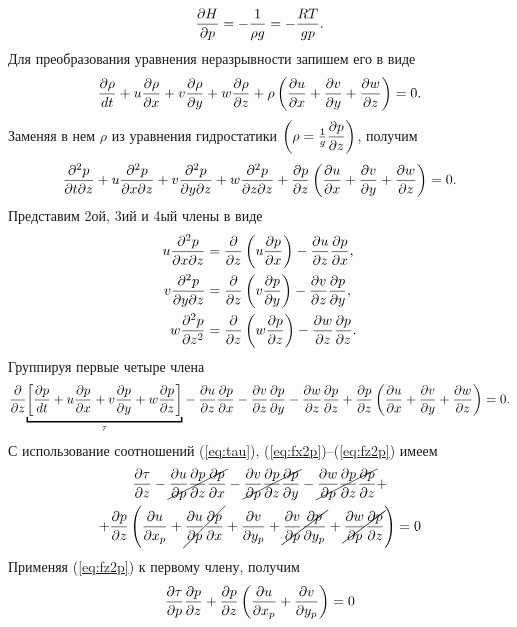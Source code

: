     \begin{equation}
        \label{ch6:DwDt2p}
        \pd{H}{p}=-\frac{1}{\rho g}=-\frac{RT}{gp}.
    \end{equation}
    Для преобразования уравнения неразрывности запишем его в виде
    \begin{equation*}
        \fd{\rho} + \rho \left( \pd{u}{x} + \pd{v}{y} + \pd{w}{z} \right) = 0.
    \end{equation*}
    Заменяя в нем $\rho$ из уравнения гидростатики $\left( \rho=\frac{1}{g} \pd{p}{z} \right)$, получим
    \begin{equation*}
        \frac{\partial^2 p}{\partial t \partial z} +
        u\frac{\partial^2 p}{\partial x \partial z} +
        v\frac{\partial^2 p}{\partial y \partial z} +
        w\frac{\partial^2 p}{\partial z \partial z} +
        \pd{p}{z} \left( \pd{u}{x} + \pd{v}{y} + \pd{w}{z} \right) = 0.
    \end{equation*}
    Представим 2ой, 3ий и 4ый члены в виде
    \begin{align*}
        u\frac{\partial^2 p}{\partial x \partial z} &= \pd{}{z} \left( u\pd{p}{x} \right) - \pd{u}{z}\pd{p}{x}, \\
        v\frac{\partial^2 p}{\partial y \partial z} &= \pd{}{z} \left( v\pd{p}{y} \right) - \pd{v}{z}\pd{p}{y}, \\
        w\frac{\partial^2 p}{\partial z^2} &= \pd{}{z} \left( w\pd{p}{z} \right) - \pd{w}{z}\pd{p}{z}.
    \end{align*}
    Группируя первые четыре члена
    \begin{align*}
        \pd{}{z} {\ub{\left[ \fd{p} \right]}_{\tau}} - \pd{u}{z}\pd{p}{x}-\pd{v}{z}\pd{p}{y}-\pd{w}{z}\pd{p}{z}+\pd{p}{z} \left( \pd{u}{x} + \pd{v}{y} + \pd{w}{z} \right) = 0.
    \end{align*}
   С использование соотношений (\ref{eq:tau}), (\ref{eq:fx2p})--(\ref{eq:fz2p}) имеем
   \begin{multline*}
       \pd{\tau}{z}-
       \cancel{\pd{u}{p}\pd{p}{z}\pd{p}{x}}-
       \cancel{\pd{v}{p}\pd{p}{z}\pd{p}{y}}-
       \cancel{\pd{w}{p}\pd{p}{z}\pd{p}{z}}+ \\
     + \pd{p}{z} \left( \pd{u}{x_p} + \cancel{\pd{u}{p}\pd{p}{x}} + 
     \pd{v}{y_p} + \cancel{\pd{v}{p}\pd{p}{y_p}}+\cancel{\pd{w}{p}\pd{p}{z}} \right) = 0
   \end{multline*}
   Применяя (\ref{eq:fz2p}) к первому члену, получим
   \begin{equation*}
       \pd{\tau}{p}\pd{p}{z} + \pd{p}{z} \left( \pd{u}{x_p} + \pd{v}{y_p} \right) = 0
   \end{equation*}
